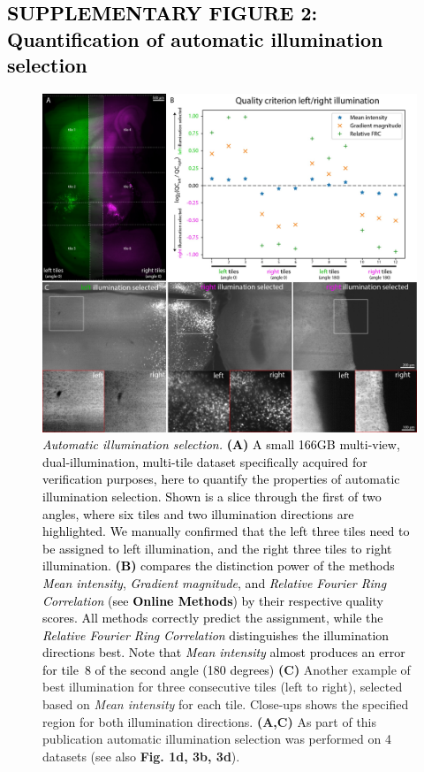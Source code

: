\documentclass[]{spie}  %
\def\red{\textcolor{black}}
\begin{document}
\subsection*{\red{SUPPLEMENTARY FIGURE 2: Quantification of automatic illumination selection}}
\vspace{1mm}
\begin{figure}[h!]
\includegraphics[width=\textwidth]{fig-Illumination-Select.jpg}
\vspace{-2.0mm}
\caption{\hspace{-0.5mm} \red{\emph{Automatic illumination selection.} \textbf{(A)} A small 166GB multi-view, dual-illumination, multi-tile dataset specifically acquired for verification purposes, here to quantify the properties of automatic illumination selection. Shown is a slice through the first of two angles, where six tiles and two illumination directions are highlighted. We manually confirmed that the left three tiles need to be assigned to left illumination, and the right three tiles to right illumination. \textbf{(B)} compares the distinction power of the methods \emph{Mean intensity}, \emph{Gradient magnitude}, and \emph{Relative Fourier Ring Correlation} (see \textbf{Online Methods}) by their respective quality scores. All methods correctly predict the assignment, while the \emph{Relative Fourier Ring Correlation} distinguishes the illumination directions best. Note that \emph{Mean intensity} almost produces an error for tile~8 of the second angle (180 degrees)} \textbf{(C)} Another example of best illumination for three consecutive tiles (left to right), selected based on \emph{Mean intensity} for each tile. Close-ups shows the specified region for both illumination directions. \textbf{(A,C)} As part of this publication automatic illumination selection was performed on 4 datasets (see also \textbf{Fig. 1d, 3b, 3d}).
}
\label{fig:sup-fig-illu-select}
\end{figure}
\end{document}
